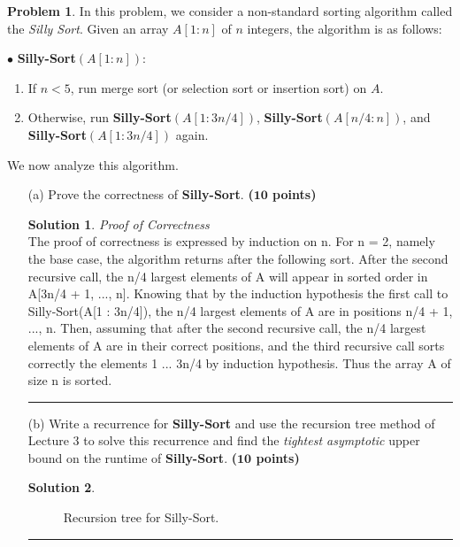 \documentclass{article}
\theoremstyle{definition}
\newtheorem{problem}{Problem}
\def\fline{\rule{0.75\linewidth}{0.5pt}}
\newcommand{\finishline}{\begin{center}\fline\end{center}}
\newtheorem*{solution*}{Solution}
\newenvironment{solution}{\begin{solution*}}{{\finishline} \end{solution*}}
\newcommand{\grade}[1]{\hfill{\textbf{($\mathbf{#1}$ points)}}}
\begin{document}
\smallskip

\begin{problem}
	In this problem, we consider a non-standard sorting algorithm called the \emph{Silly Sort}. Given an array $A[1:n]$ of $n$ integers, the algorithm is as follows: 
	
	$\bullet$ \textbf{Silly-Sort}$(A[1:n])$:
	\begin{enumerate}
		\item If $n < 5$, run merge sort (or selection sort or insertion sort) on $A$.  
		\item Otherwise, run \textbf{Silly-Sort}$(A[1:3n/4])$, \textbf{Silly-Sort}$(A[n/4:n])$, and \textbf{Silly-Sort}$(A[1:3n/4])$ again. 
	\end{enumerate} 
	
	We now analyze this algorithm. 
	
	\begin{enumerate}
		\item [(a)] Prove the correctness of  \textbf{Silly-Sort}. \grade{10} 
		
	\begin{solution}
	
	\emph{Proof of Correctness} \\
		The proof of correctness is expressed by induction on n. For n = 2, namely the base case, the algorithm returns after the following sort. After the second recursive call, the n/4 largest elements of A will appear in sorted order in 		A[3n/4 + 1, ..., n]. Knowing that by the induction hypothesis the first call to Silly-Sort(A[1 : 3n/4]), the n/4 largest elements of A are in positions n/4 + 1, ..., n. Then, assuming that after the second recursive call, the n/4 largest 		elements of A are in their correct positions, and the third recursive call sorts correctly the elements 1 ... 3n/4 by induction hypothesis. Thus the array A of size n is sorted.
	
\end{solution}

		\item [(b)] Write a recurrence for  \textbf{Silly-Sort} and use the recursion tree method of Lecture 3 to solve this recurrence and find the \emph{tightest asymptotic} upper bound on the runtime of \textbf{Silly-Sort}. \grade{10}
		
	\begin{solution}
	
	\begin{figure}[h!]
			\centering
			\caption{Recursion tree for Silly-Sort.} 
		\end{figure}
		

\end{solution}
\end{enumerate}
\end{problem}
\end{document}
